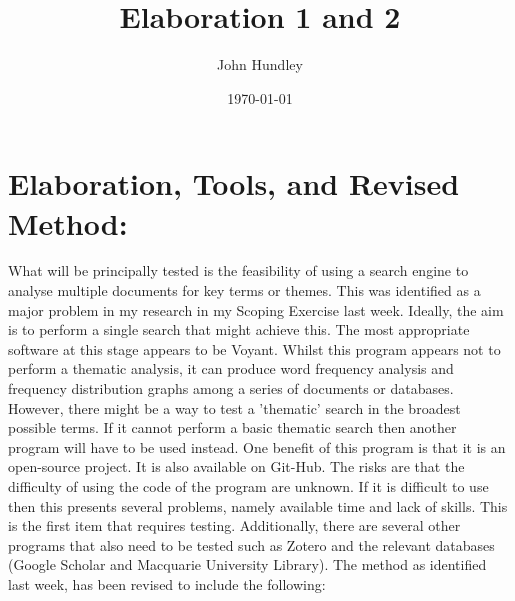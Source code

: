 \documentclass[a4paper,12pt]{article}
\title{Elaboration 1 and 2}
\author{John Hundley}
\date{\today}
\begin{document}
\maketitle

\section{Elaboration, Tools, and Revised Method:}

What will be principally tested is the feasibility of using a search engine to analyse multiple documents for key terms or themes. This was identified as a major problem in my research in my Scoping Exercise last week. Ideally, the aim is to perform a single search that might achieve this. The most appropriate software at this stage appears to be Voyant. Whilst this program appears not to perform a thematic analysis, it can produce word frequency analysis and frequency distribution graphs among a series of documents or databases. However, there might be a way to test a 'thematic' search in the broadest possible terms. If it cannot perform a basic thematic search then another program will have to be used instead. One benefit of this program is that it is an open-source project. It is also available on Git-Hub. The risks are that the difficulty of using the code of the program are unknown. If it is difficult to use then this presents several problems, namely available time and lack of skills. This is the first item that requires testing. Additionally, there are several other programs that also need to be tested such as Zotero and the relevant databases (Google Scholar and Macquarie University Library). The method as identified last week, has been revised to include the following: 
\end{document}
